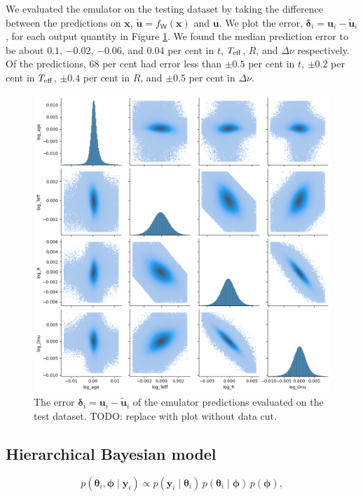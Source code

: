 \documentclass[fleqn,usenatbib]{mnras}
\renewcommand*{\vec}[1]{\boldsymbol{#1}}
\newcommand{\obs}{{y}}
\newcommand{\inputs}{{x}}
\newcommand{\outputs}{{u}}
\newcommand{\pred}{{\tilde{\outputs}}}
\newcommand{\error}{{\delta}}
\newcommand{\teff}[1][]{{\ensuremath{T_{\mathrm{eff} \ifx#1\empty \else , #1 \fi}}}}
\begin{document}
We evaluated the emulator on the testing dataset by taking the difference between the predictions on \(\vec\inputs\), \(\vec\pred = f_\mathsf{W}(\vec\inputs)\) and \(\vec\outputs\). We plot the error, \(\vec\error_i = \vec\outputs_i - \vec\pred_i\), for each output quantity in Figure \ref{fig:error}. We found the median prediction error to be about \(0.1\), \(-0.02\), \(-0.06\), and \(0.04\) per cent in \(t\), \(\teff\), \(R\), and \(\Delta\nu\) respectively. Of the predictions, 68 per cent had error less than \(\pm 0.5\) per cent in \(t\), \(\pm 0.2\) per cent in \(\teff\), \(\pm 0.4\) per cent in \(R\), and \(\pm 0.5\) per cent in \(\Delta\nu\).

\begin{figure}
    \centering
    \includegraphics[width=1.0\linewidth]{figures/error.png}
    \caption{The error \(\vec\error_i = \vec\outputs_i - \vec\pred_i\) of the emulator predictions evaluated on the test dataset. TODO: replace with plot without data cut.}
    \label{fig:error}
\end{figure}

\subsection{Hierarchical Bayesian model}
\label{sec:hbm}

%
\begin{equation}
    p(\vec \theta_i, \vec \phi \mid \vec\obs_i) \propto p(\vec\obs_i \mid \vec \theta_i) \, p(\vec\theta_i \mid \vec\phi) \, p(\vec\phi),
\end{equation}
%
\end{document}
